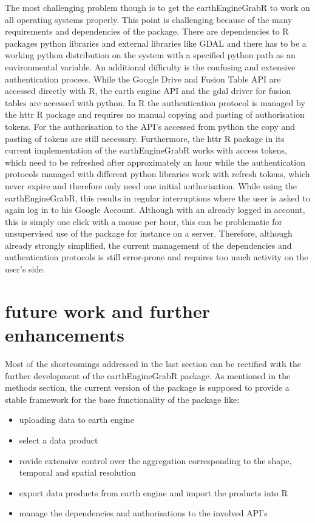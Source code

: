 \documentclass[12pt,twoside,a4paper,final]{report}
\begin{document}
The most challenging problem though is to get the earthEngineGrabR to work on all operating systems properly. This point is challenging because of the many requirements and dependencies of the package. There are dependencies to R packages python libraries and external libraries like GDAL and there has to be a working python distribution on the system with a specified python path as an environmental variable. An additional difficulty is the confusing and extensive authentication process. While the Google Drive and Fusion Table API are accessed directly with R, the earth engine API and the gdal driver for fusion tables are accessed with python. In R the authentication protocol is managed by the httr R package and requires no manual copying and pasting of authorisation tokens. For the authorisation to the API's accessed from python the copy and pasting of tokens are still necessary. 
Furthermore, the httr R package in its current implementation of the earthEngineGrabR works with access tokens, which need to be refreshed after approximately an hour while the authentication protocols managed with different python libraries work with refresh tokens, which never expire and therefore only need one initial authorisation. While using the earthEngineGrabR, this results in regular interruptions where the user is asked to again log in to his Google Account. Although with an already logged in account, this is simply one click with a mouse per hour, this can be problematic for unsupervised use of the package for instance on a  server. Therefore, although already strongly simplified, the current management of the dependencies and authentication protocols is still error-prone and requires too much activity on the user's side.

\section{future work and further enhancements}

Most of the shortcomings addressed in the last section can be rectified with the further development of the earthEngineGrabR package. As mentioned in the methods section, the current version of the package is supposed to provide a stable framework for the base functionality of the package like: 

\begin{itemize}

\item uploading data to earth engine
\item select a data product
\item rovide extensive control over the aggregation corresponding to the shape, temporal and spatial resolution
\item export data products from earth engine and import the products into R
\item manage the dependencies and authorisations to the involved API's

\end{itemize}
\end{document}
